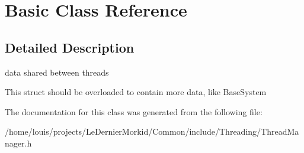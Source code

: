 \hypertarget{class_basic}{}\section{Basic Class Reference}
\label{class_basic}


\subsection{Detailed Description}
data shared between threads

This struct should be overloaded to contain more data, like Base\+System 

The documentation for this class was generated from the following file\+:\begin{DoxyCompactItemize}
\item 
/home/louis/projects/\+Le\+Dernier\+Morkid/\+Common/include/\+Threading/Thread\+Manager.\+h\end{DoxyCompactItemize}
